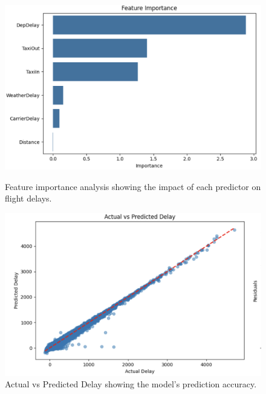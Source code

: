 \begin{figure}[!ht]
    \centering
    \begin{minipage}[b]{0.48\textwidth} %
      \centering
      \includegraphics[width=\textwidth]{../img/diag.png} %
      \caption{Feature importance analysis showing the impact of each predictor on flight delays.}
      \label{fig:feature_importance}
    \end{minipage}
    \hfill %
    \begin{minipage}[b]{0.48\textwidth}
      \centering
      \includegraphics[width=\textwidth]{../img/avsp.png}
      \caption{Actual vs Predicted Delay showing the model’s prediction accuracy.}
      \label{fig:actual_vs_predicted}
    \end{minipage}
  \end{figure}


